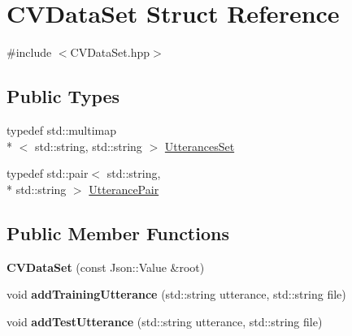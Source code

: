\hypertarget{structCVDataSet}{\section{C\+V\+Data\+Set Struct Reference}
\label{structCVDataSet}
}


{\ttfamily \#include $<$C\+V\+Data\+Set.\+hpp$>$}

\subsection*{Public Types}
\begin{DoxyCompactItemize}
\item 
typedef std\+::multimap\\*
$<$ std\+::string, std\+::string $>$ \hyperlink{structCVDataSet_a1a8ca580cc2dde6a91fb66c82e00b747}{Utterances\+Set}
\item 
typedef std\+::pair$<$ std\+::string, \\*
std\+::string $>$ \hyperlink{structCVDataSet_a39298839ccc861d9828d8fe2d1915110}{Utterance\+Pair}
\end{DoxyCompactItemize}
\subsection*{Public Member Functions}
\begin{DoxyCompactItemize}
\item 
\hypertarget{structCVDataSet_a336a218fba202ee0e0fc55f9bba02f60}{{\bfseries C\+V\+Data\+Set} (const Json\+::\+Value \&root)}\label{structCVDataSet_a336a218fba202ee0e0fc55f9bba02f60}

\item 
\hypertarget{structCVDataSet_a95ee808ec80b03fdee185ac91de59d5a}{void {\bfseries add\+Training\+Utterance} (std\+::string utterance, std\+::string file)}\label{structCVDataSet_a95ee808ec80b03fdee185ac91de59d5a}

\item 
\hypertarget{structCVDataSet_a7050c41cc41f6d9b2a080461c1d049b9}{void {\bfseries add\+Test\+Utterance} (std\+::string utterance, std\+::string file)}\label{structCVDataSet_a7050c41cc41f6d9b2a080461c1d049b9}

\end{DoxyCompactItemize}
